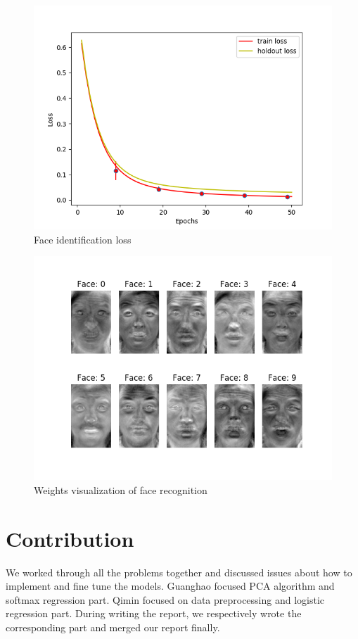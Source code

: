 \documentclass{article}
\begin{document}
\begin{figure}[ht]
\begin{center}
\includegraphics[scale=0.5]{images/loss_recog.png}
\end{center}
\caption{Face identification loss}
\label{figure: loss_recog}
\end{figure}

\begin{figure}[ht]
\begin{center}
\includegraphics[scale=0.5]{images/visualization2.png}
\end{center}
\caption{Weights visualization of face recognition}
\label{figure: visualization2}
\end{figure}


\FloatBarrier

\section{Contribution}
We worked through all the problems together and discussed issues about how to implement and fine tune the models. Guanghao focused PCA algorithm and softmax regression part. Qimin focused on data preprocessing and logistic regression part. During writing the report, we respectively wrote the corresponding part and merged our report finally.
\end{document}
